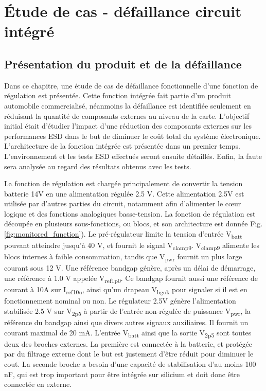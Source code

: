 \chapter{Étude de cas - défaillance circuit intégré}
\label{chap:3}
\section{Présentation du produit et de la défaillance}

Dans ce chapitre, une étude de cas de défaillance fonctionnelle d'une fonction de régulation est présentée.
Cette fonction intégrée fait partie d'un produit automobile commercialisé, néanmoins la défaillance est identifiée seulement en réduisant la quantité de composants externes au niveau de la carte.
L'objectif initial était d'étudier l'impact d'une réduction des composants externes sur les performances ESD dans le but de diminuer le coût total du système électronique.
L'architecture de la fonction intégrée est présentée dans un premier temps.
L'environnement et les tests ESD effectués seront ensuite détaillés.
Enfin, la faute sera analysée au regard des résultats obtenus avec les tests.

La fonction de régulation est chargée principalement de convertir la tension batterie 14V en une alimentation régulée 2.5 V.
Cette alimentation 2.5V est utilisée par d'autres parties du circuit, notamment afin d'alimenter le cœur logique et des fonctions analogiques basse-tension.
La fonction de régulation est découpée en plusieurs sous-fonctions, ou blocs, et son architecture est donnée Fig. \ref{fig:monitored_function}).
Le pré-régulateur limite la tension d'entrée V\textsubscript{batt} pouvant atteindre jusqu'à 40 V, et fournit le signal V\textsubscript{clamp9}.
V\textsubscript{clamp9} alimente les blocs internes à faible consommation, tandis que V\textsubscript{pwr} fournit un plus large courant sous 12 V.
Une référence bandgap génère, après un délai de démarrage, une référence à 1.0 V appelée V\textsubscript{ref1p0}.
Ce bandgap fournit aussi une référence de courant à 10\textmu{}A sur I\textsubscript{ref10u}, ainsi qu'un drapeau V\textsubscript{bgok} pour signaler si il est en fonctionnement nominal ou non.
Le régulateur 2.5V génère l'alimentation stabilisée 2.5 V sur V\textsubscript{2p5} à partir de l'entrée non-régulée de puissance V\textsubscript{pwr}, la référence du bandgap ainsi que divers autres signaux auxiliaires.
Il fournit un courant maximal de 20 mA.
L'entrée V\textsubscript{batt} ainsi que la sortie V\textsubscript{2p5} sont toutes deux des broches externes.
La première est connectée à la batterie, et protégée par du filtrage externe dont le but est justement d'être réduit pour diminuer le cout.
La seconde broche a besoin d'une capacité de stabilisation d'au moins 100 nF, qui est trop important pour être intégrée sur silicium et doit donc être connectée en externe.

